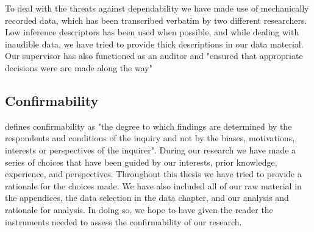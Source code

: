To deal with the threats against dependability we have made use of mechanically recorded data, which has been transcribed verbatim by two different researchers. Low inference descriptors has been used when possible, and while dealing with inaudible data, we have tried to provide thick descriptions in our data material. Our supervisor has also functioned as an auditor and "ensured that appropriate decisions were are made along the way" \citep{baxter1997evaluating}

\subsection{Confirmability}
\citet{lincoln1985naturalistic} defines confirmability as "the degree to which findings are determined by the respondents and conditions of the inquiry and not by the biases, motivations, interests or perspectives of the inquirer". During our research we have made a series of choices that have been guided by our interests, prior knowledge, experience, and perspectives. Throughout this thesis we have tried to provide a rationale for the choices made. We have also included all of our raw material in the appendices, the data selection in the data chapter, and our analysis and rationale for analysis. In doing so, we hope to have given the reader the instruments needed to assess the confirmability of our research.  
